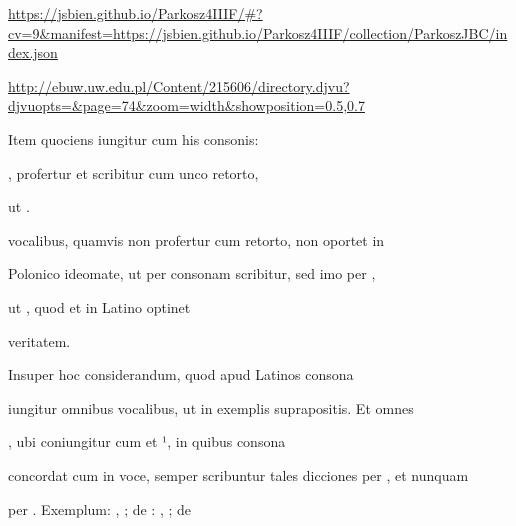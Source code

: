 
\newParkoszpage

{
  \url{https://jsbien.github.io/Parkosz4IIIF/\#?cv=9&manifest=https://jsbien.github.io/Parkosz4IIIF/collection/ParkoszJBC/index.json}

\url{http://ebuw.uw.edu.pl/Content/215606/directory.djvu?djvuopts=&page=74&zoom=width&showposition=0.5,0.7}
}

\bigskip

\obeylines
\mono



\fullpreviouslines


{
\color{blue}

\indentK Item quociens iungitur cum his consonis: 

    , profertur et scribitur cum unco retorto,

}


\fulllines

ut    .

vocalibus, quamvis non profertur cum  retorto, non oportet in

Polonico ideomate,  ut per  consonam scribitur, sed imo per ,

ut    , quod et in Latino optinet

\splitlines

veritatem.

\indentK Insuper hoc considerandum, quod apud Latinos  consona

\fulllines

iungitur omnibus vocalibus, ut in exemplis suprapositis. Et omnes 

, ubi  coniungitur cum   et ¹, in quibus  consona

concordat cum  in voce, semper scribuntur tales dicciones per , et nunquam

per . Exemplum: , ; de : , ; de 

